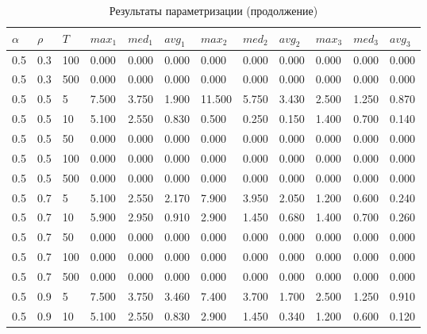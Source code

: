 \documentclass{bmstu}
\begin{document}
	\begin{longtable}{|p{}|p{}|p{}|p{}|p{}|p{}|p{}|p{}|p{}|p{}|p{}|p{}|}
	\caption{\label{tab:params2}Результаты параметризации (продолжение)} \\
	\hline
	$\alpha$ & $\rho$ & $T$ & $max_1$ & $med_1$ & $avg_1$  & $max_2$ & $med_2$ & $avg_2$  & $max_3$ & $med_3$ & $avg_3$ \\
	\hline
		0.5 & 0.3 & 100 & 0.000 & 0.000 & 0.000 & 0.000 & 0.000 & 0.000 & 0.000 & 0.000 & 0.000 \\
		\hline
		0.5 & 0.3 & 500 & 0.000 & 0.000 & 0.000 & 0.000 & 0.000 & 0.000 & 0.000 & 0.000 & 0.000 \\
		\hline
		0.5 & 0.5 & 5 & 7.500 & 3.750 & 1.900 & 11.500 & 5.750 & 3.430 & 2.500 & 1.250 & 0.870 \\
		\hline
		0.5 & 0.5 & 10 & 5.100 & 2.550 & 0.830 & 0.500 & 0.250 & 0.150 & 1.400 & 0.700 & 0.140 \\
		\hline
		0.5 & 0.5 & 50 & 0.000 & 0.000 & 0.000 & 0.000 & 0.000 & 0.000 & 0.000 & 0.000 & 0.000 \\
		\hline
		0.5 & 0.5 & 100 & 0.000 & 0.000 & 0.000 & 0.000 & 0.000 & 0.000 & 0.000 & 0.000 & 0.000 \\
		\hline
		0.5 & 0.5 & 500 & 0.000 & 0.000 & 0.000 & 0.000 & 0.000 & 0.000 & 0.000 & 0.000 & 0.000 \\
		\hline
		0.5 & 0.7 & 5 & 5.100 & 2.550 & 2.170 & 7.900 & 3.950 & 2.050 & 1.200 & 0.600 & 0.240 \\
		\hline
		0.5 & 0.7 & 10 & 5.900 & 2.950 & 0.910 & 2.900 & 1.450 & 0.680 & 1.400 & 0.700 & 0.260 \\
		\hline
		0.5 & 0.7 & 50 & 0.000 & 0.000 & 0.000 & 0.000 & 0.000 & 0.000 & 0.000 & 0.000 & 0.000 \\
		\hline
		0.5 & 0.7 & 100 & 0.000 & 0.000 & 0.000 & 0.000 & 0.000 & 0.000 & 0.000 & 0.000 & 0.000 \\
		\hline
		0.5 & 0.7 & 500 & 0.000 & 0.000 & 0.000 & 0.000 & 0.000 & 0.000 & 0.000 & 0.000 & 0.000 \\
		\hline
		0.5 & 0.9 & 5 & 7.500 & 3.750 & 3.460 & 7.400 & 3.700 & 1.700 & 2.500 & 1.250 & 0.910 \\
		\hline
		0.5 & 0.9 & 10 & 5.100 & 2.550 & 0.830 & 2.900 & 1.450 & 0.340 & 1.200 & 0.600 & 0.120 \\

\end{longtable}
\end{document}
